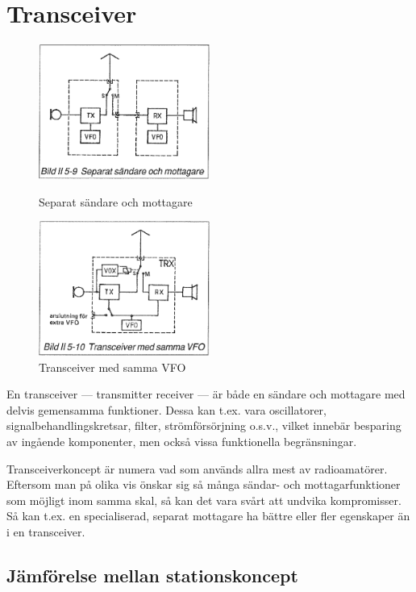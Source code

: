 \section{Transceiver}

\begin{figure}
  \includegraphics[width=0.5\textwidth]{images/bild_2_5-09}
  \caption{Separat sändare och mottagare}
  \label{fig:bildII5-9}

  \includegraphics[width=0.5\textwidth]{images/bild_2_5-10}
  \caption{Transceiver med samma VFO}
  \label{fig:bildII5-10}
\end{figure}

En transceiver --- transmitter receiver --- är både en sändare och
mottagare med delvis gemensamma funktioner. Dessa kan t.ex.  vara
oscillatorer, signalbehandlingskretsar, filter, strömförsörjning
o.s.v., vilket innebär besparing av ingående komponenter, men också
vissa funktionella begränsningar.

Transceiverkoncept är numera vad som används allra mest av
radioamatörer. Eftersom man på olika vis önskar sig så många sändar-
och mottagarfunktioner som möjligt inom samma skal, så kan det vara
svårt att undvika kompromisser. Så kan t.ex. en specialiserad, separat
mottagare ha bättre eller fler egenskaper än i en transceiver.

\subsection{Jämförelse mellan stationskoncept}


